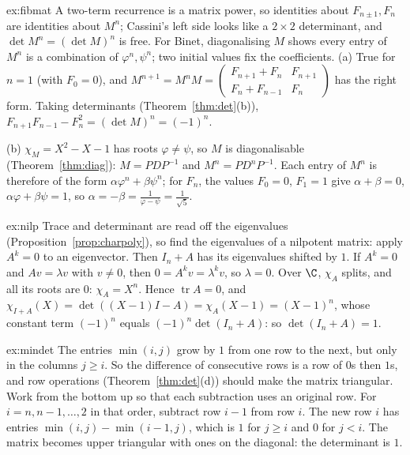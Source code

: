 \begin{solution}{ex:fibmat}
\idea A two-term recurrence is a matrix power, so identities about $F_{n\pm1},F_n$ are identities about $M^n$; Cassini's left side looks like a $2\times2$ determinant, and $\det M^n=(\det M)^n$ is free. For Binet, diagonalising $M$ shows every entry of $M^n$ is a combination of $\varphi^n,\psi^n$; two initial values fix the coefficients.
\writeup (a) True for $n=1$ (with $F_0=0$), and $M^{n+1}=M^nM=\begin{pmatrix}F_{n+1}+F_n&F_{n+1}\\F_n+F_{n-1}&F_n\end{pmatrix}$ has the right form.
Taking determinants (Theorem~\ref{thm:det}(b)), $F_{n+1}F_{n-1}-F_n^2=(\det M)^n=(-1)^n$.

(b) $\chi_M=X^2-X-1$ has roots $\varphi\ne\psi$, so $M$ is diagonalisable (Theorem~\ref{thm:diag}): $M=PDP^{-1}$ and $M^n=PD^nP^{-1}$. Each entry of $M^n$ is therefore of the form
$\alpha\varphi^n+\beta\psi^n$; for $F_n$, the values $F_0=0$, $F_1=1$ give $\alpha+\beta=0$, $\alpha\varphi+\beta\psi=1$, so $\alpha=-\beta=\frac1{\varphi-\psi}=\frac1{\sqrt5}$.
\end{solution}

\begin{solution}{ex:nilp}
\idea Trace and determinant are read off the eigenvalues (Proposition~\ref{prop:charpoly}), so find the eigenvalues of a nilpotent matrix: apply $A^k=0$ to an eigenvector. Then $I_n+A$ has its eigenvalues shifted by $1$.
\writeup If $A^k=0$ and $Av=\lambda v$ with $v\ne0$, then $0=A^kv=\lambda^kv$, so $\lambda=0$. Over $\C$, $\chi_A$ splits, and all its roots are $0$: $\chi_A=X^n$. Hence
$\operatorname{tr}A=0$, and $\chi_{I+A}(X)=\det((X-1)I-A)=\chi_A(X-1)=(X-1)^n$, whose constant term $(-1)^n$ equals $(-1)^n\det(I_n+A)$: so $\det(I_n+A)=1$.
\end{solution}

\begin{solution}{ex:mindet}
\idea The entries $\min(i,j)$ grow by $1$ from one row to the next, but only in the columns $j\ge i$. So the difference of consecutive rows is a row of $0$s then $1$s, and row operations (Theorem~\ref{thm:det}(d)) should make the matrix triangular. Work from the bottom up so that each subtraction uses an original row.
\writeup For $i=n,n-1,\dots,2$ in that order, subtract row $i-1$ from row $i$. The new row $i$ has entries $\min(i,j)-\min(i-1,j)$, which is $1$ for $j\ge i$ and $0$ for $j<i$.
The matrix becomes upper triangular with ones on the diagonal: the determinant is $1$.
\end{solution}

